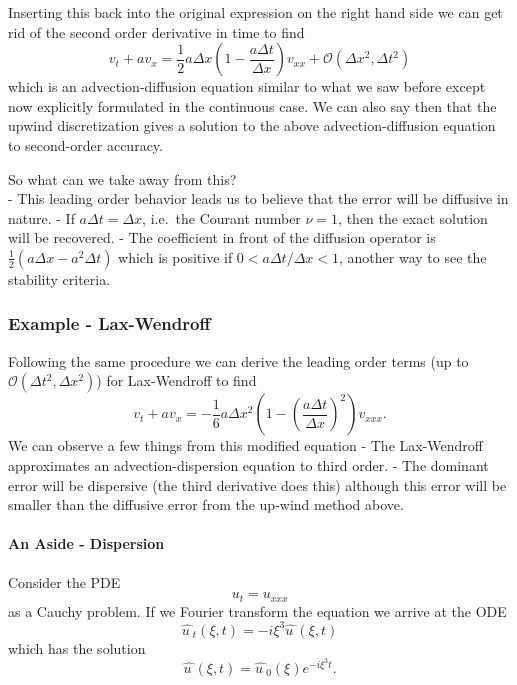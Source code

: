 \documentclass[11pt]{article}
\begin{document}
    Inserting this back into the original expression on the right hand side
we can get rid of the second order derivative in time to find \[
    v_t + a v_x = \frac{1}{2} a \Delta x \left(1 - \frac{a \Delta t}{\Delta x} \right) v_{xx} + \mathcal{O}(\Delta x^2, \Delta t^2)
\] which is an advection-diffusion equation similar to what we saw
before except now explicitly formulated in the continuous case. We can
also say then that the upwind discretization gives a solution to the
above advection-diffusion equation to second-order accuracy.

    So what can we take away from this?\\
- This leading order behavior leads us to believe that the error will be
diffusive in nature. - If \(a \Delta t = \Delta x\), i.e.~the Courant
number \(\nu = 1\), then the exact solution will be recovered. - The
coefficient in front of the diffusion operator is
\(\frac{1}{2} (a \Delta x - a^2 \Delta t)\) which is positive if
\(0 < a \Delta t / \Delta x < 1\), another way to see the stability
criteria.

    \hypertarget{example---lax-wendroff}{%
\subsubsection{Example - Lax-Wendroff}\label{example---lax-wendroff}}

Following the same procedure we can derive the leading order terms (up
to \(\mathcal{O}(\Delta t^2, \Delta x^2)\)) for Lax-Wendroff to find \[
    v_t + a v_x = -\frac{1}{6} a \Delta x^2 \left( 1 - \left(\frac{a \Delta t}{\Delta x}\right)^2 \right) v_{xxx}.
\] We can observe a few things from this modified equation - The
Lax-Wendroff approximates an advection-dispersion equation to third
order. - The dominant error will be dispersive (the third derivative
does this) although this error will be smaller than the diffusive error
from the up-wind method above.

    \hypertarget{an-aside---dispersion}{%
\paragraph{An Aside - Dispersion}\label{an-aside---dispersion}}

Consider the PDE \[
    u_t = u_{xxx}
\] as a Cauchy problem. If we Fourier transform the equation we arrive
at the ODE \[
    \hat{u~}_t(\xi,t) = - i \xi^3 \hat{u~}(\xi, t)
\] which has the solution \[
    \hat{u~}(\xi, t) = \hat{u~}_0(\xi) e^{-i \xi^3 t}.
\]
\end{document}

